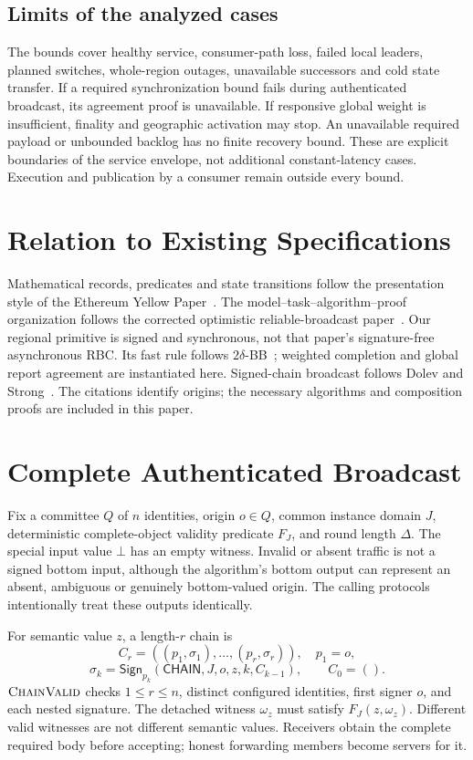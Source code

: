 \documentclass[11pt,a4paper,onecolumn]{article}
\newcommand{\Sig}{\mathsf{Sign}}
\newcommand{\botv}{\bot}
\newcommand{\Tag}[1]{\mathsf{#1}}
\newcommand{\Proc}[1]{\textnormal{\textsc{#1}}}
\theoremstyle{remark}\newtheorem{example}[definition]{Example}
\newcounter{protocol}
\begin{document}
\subsection{Limits of the analyzed cases}
The bounds cover healthy service, consumer-path loss, failed local leaders,
planned switches, whole-region outages, unavailable successors and cold state
transfer. If a required synchronization bound fails during authenticated
broadcast, its agreement proof is unavailable. If responsive global weight is
insufficient, finality and geographic activation may stop. An unavailable
required payload or unbounded backlog has no finite recovery bound. These are
explicit boundaries of the service envelope, not additional constant-latency
cases. Execution and publication by a consumer remain outside every bound.

\section*{Relation to Existing Specifications}
Mathematical records, predicates and state transitions follow the presentation
style of the Ethereum Yellow Paper~\cite{yellowpaper}. The model--task--algorithm--proof
organization follows the corrected optimistic reliable-broadcast paper~\cite{optimistic}.
Our regional primitive is signed and synchronous, not that paper's signature-free
asynchronous RBC. Its fast rule follows $2\delta$-BB~\cite{goodcase}; weighted
completion and global report agreement are instantiated here. Signed-chain
broadcast follows Dolev and Strong~\cite{ds}. The citations identify origins;
the necessary algorithms and composition proofs are included in this paper.

\appendix
\section{Complete Authenticated Broadcast}\label{app:ab}
Fix a committee $Q$ of $n$ identities, origin $o\in Q$, common instance domain
$J$, deterministic complete-object validity predicate $F_J$, and round length
$\Delta$. The special input value $\botv$ has an empty witness. Invalid or absent
traffic is not a signed bottom input, although the algorithm's bottom output
can represent an absent, ambiguous or genuinely bottom-valued origin. The
calling protocols intentionally treat these outputs identically.

For semantic value $z$, a length-$r$ chain is
\[
 C_r=((p_1,\sigma_1),\ldots,(p_r,\sigma_r)),\quad p_1=o,
\]
\[
 \sigma_k=\Sig_{p_k}(\Tag{CHAIN},J,o,z,k,C_{k-1}),\qquad C_0=().
\]
$\Proc{ChainValid}$ checks $1\leq r\leq n$, distinct configured identities,
first signer $o$, and each nested signature. The detached witness $\omega_z$
must satisfy $F_J(z,\omega_z)$. Different valid witnesses are not different
semantic values. Receivers obtain the complete required body before accepting;
honest forwarding members become servers for it.
\end{document}
